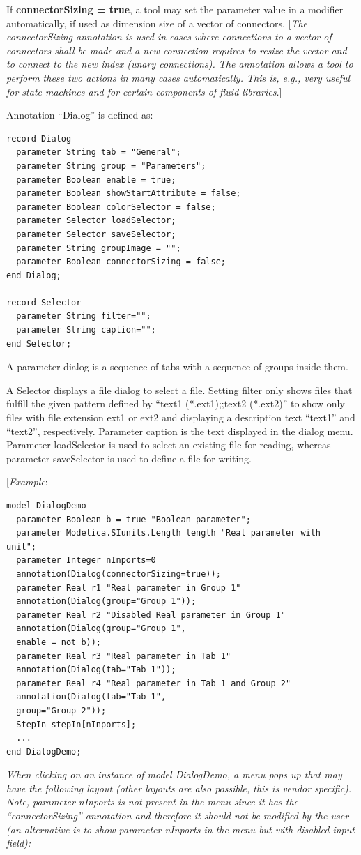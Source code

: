 \documentclass[10pt,a4paper]{report}
\begin{document}
If \textbf{connectorSizing = true}, a tool may set the parameter value
in a modifier automatically, if used as dimension size of a vector of
connectors. {[}\emph{The connectorSizing annotation is used in cases
where connections to a vector of connectors shall be made and a new
connection requires to resize the vector and to connect to the new index
(unary connections). The annotation allows a tool to perform these two
actions in many cases automatically. This is, e.g., very useful for
state machines and for certain components of fluid libraries.}{]}

Annotation ``Dialog'' is defined as:

\begin{lstlisting}[language=modelica]
record Dialog
  parameter String tab = "General";
  parameter String group = "Parameters";
  parameter Boolean enable = true;
  parameter Boolean showStartAttribute = false;
  parameter Boolean colorSelector = false;
  parameter Selector loadSelector;
  parameter Selector saveSelector;
  parameter String groupImage = "";
  parameter Boolean connectorSizing = false;
end Dialog;

record Selector
  parameter String filter="";
  parameter String caption="";
end Selector;
\end{lstlisting}
A parameter dialog is a sequence of tabs with a sequence of groups
inside them.

A Selector displays a file dialog to select a file. Setting filter only
shows files that fulfill the given pattern defined by ``text1
(*.ext1);;text2 (*.ext2)'' to show only files with file extension
ext1 or ext2 and displaying a description text ``text1'' and
``text2'', respectively. Parameter caption is the text displayed in the
dialog menu. Parameter loadSelector is used to select an existing file
for reading, whereas parameter saveSelector is used to define a file for
writing.

{[}\emph{Example}:

\begin{lstlisting}[language=modelica]
model DialogDemo
  parameter Boolean b = true "Boolean parameter";
  parameter Modelica.SIunits.Length length "Real parameter with
unit";
  parameter Integer nInports=0
  annotation(Dialog(connectorSizing=true));
  parameter Real r1 "Real parameter in Group 1"
  annotation(Dialog(group="Group 1"));
  parameter Real r2 "Disabled Real parameter in Group 1"
  annotation(Dialog(group="Group 1",
  enable = not b));
  parameter Real r3 "Real parameter in Tab 1"
  annotation(Dialog(tab="Tab 1"));
  parameter Real r4 "Real parameter in Tab 1 and Group 2"
  annotation(Dialog(tab="Tab 1",
  group="Group 2"));
  StepIn stepIn[nInports];
  ...
end DialogDemo;
\end{lstlisting}
\emph{When clicking on an instance of model DialogDemo, a menu pops up
that may have the following layout (other layouts are also possible,
this is vendor specific). Note, parameter nInports is not present in the
menu since it has the ``connectorSizing'' annotation and therefore it
should not be modified by the user (an alternative is to show parameter
nInports in the menu but with disabled input field): }
\end{document}
